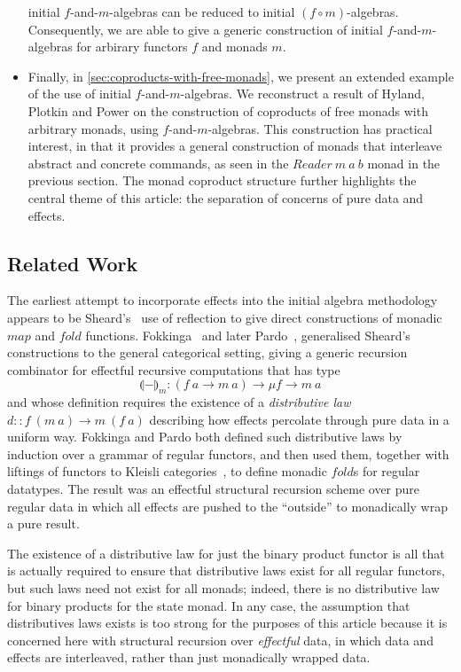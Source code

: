 \documentclass{jfp1}
\newcommand{\fold}[1]{\llparenthesis #1 \rrparenthesis}
\begin{document}
\begin{itemize}
  initial $f$-and-$m$-algebras can be reduced to initial $(f \circ
  m)$-algebras. Consequently, we are able to give a generic
  construction of initial $f$-and-$m$-algebras for arbirary functors
  $f$ and monads $m$.
\item Finally, in \autoref{sec:coproducts-with-free-monads}, we
  present an extended example of the use of initial
  $f$-and-$m$-algebras. We reconstruct a result of Hyland, Plotkin and
  Power on the construction of coproducts of free monads with
  arbitrary monads, using $f$-and-$m$-algebras. This construction has
  practical interest, in that it provides a general construction of
  monads that interleave abstract and concrete commands, as seen in
  the $\mathit{Reader}~m~a~b$ monad in the previous section. The monad
  coproduct structure further highlights the central theme of this
  article: the separation of concerns of pure data and effects.
\end{itemize}

\subsection{Related Work}

The earliest attempt to incorporate effects into the initial algebra
methodology appears to be Sheard's~\cite{she93a,she93b} use of
reflection to give direct constructions of monadic $\mathit{map}$ and
$\mathit{fold}$ functions.  Fokkinga~\cite{fokkinga94monadic} and
later Pardo~\cite{pardo04combining}, generalised Sheard's
constructions to the general categorical setting, giving a generic
recursion combinator for effectful recursive computations that has
type
\begin{displaymath}
  \fold{-}_m : (f~a \to m~a) \to \mu f \to m~a
\end{displaymath}
and whose definition requires the existence of a \emph{distributive
  law} $d :: f~(m~a) \to m~(f~a)$ describing how effects percolate
through pure data in a uniform way.  Fokkinga and Pardo both defined
such distributive laws by induction over a grammar of regular
functors, and then used them, together with liftings of functors to
Kleisli categories~\cite{bw90,mul93}, to define monadic
$\mathit{fold}$s for regular datatypes. The result was an effectful
structural recursion scheme over pure regular data in which all
effects are pushed to the ``outside'' to monadically wrap a pure
result.

The existence of a distributive law for just the binary product
functor is all that is actually required to ensure that distributive
laws exist for all regular functors, but such laws need not exist for
all monads; indeed, there is no distributive law for binary products
for the state monad. In any case, the assumption that distributives
laws exists is too strong for the purposes of this article because it
is concerned here with structural recursion over \emph{effectful}
data, in which data and effects are interleaved, rather than just
monadically wrapped data.
\end{document}
